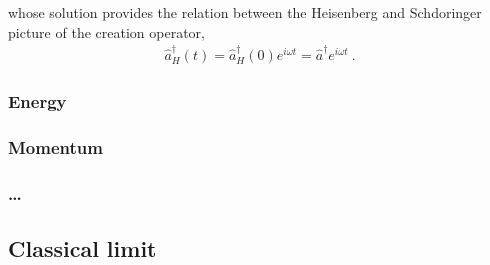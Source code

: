 \documentclass[letterpaper,10pt,english]{jupyterBook}
\begin{document}
\sphinxAtStartPar
whose solution provides the relation between the Heisenberg and Schdoringer picture of the creation operator,
\begin{equation*}
\begin{split}\hat{a}^\dagger_H(t) = \hat{a}^\dagger_H(0) e^{i \omega t} = \hat{a}^\dagger e^{i \omega t} \ .\end{split}
\end{equation*}

\subsubsection{Energy}
\label{\detokenize{ch/quantum-mechanics/qft/photons-coulomb:energy}}

\subsubsection{Momentum}
\label{\detokenize{ch/quantum-mechanics/qft/photons-coulomb:momentum}}

\subsubsection{…}
\label{\detokenize{ch/quantum-mechanics/qft/photons-coulomb:id1}}

\subsection{Classical limit}
\label{\detokenize{ch/quantum-mechanics/qft/photons-coulomb:classical-limit}}\label{\detokenize{ch/quantum-mechanics/qft/photons-coulomb:quantum-mechanics-qft-photons-coulomb-classical-limit}}
\end{document}
